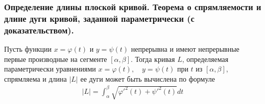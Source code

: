 \documentclass[10pt]{article}
\begin{document}
    \subsubsection{Определение длины плоской кривой. Теорема о спрямляемости и длине дуги кривой, заданной параметрически (с доказательством).}
    \begin{definition}
    \end{definition}
    \begin{theorem}
        Пусть функции $x = \varphi(t)$ и $y = \psi(t)$ непрерывна и имеют непрерывные первые производные на сегменте $[\alpha, \beta]$. Тогда кривая $L$, определяемая параметрически уравнениями $x = \varphi(t), \quad y = \psi(t)$ при $t$ из $[\alpha, \beta]$, спрямляема и длина $|L|$ ее дуги может быть вычислена по формуле
        \begin{gather*}
            |L| = \int_{\alpha}^{\beta} \sqrt{\varphi'^2(t) + \psi'^2(t)} dt
        \end{gather*}
    \end{theorem}
\end{document}
